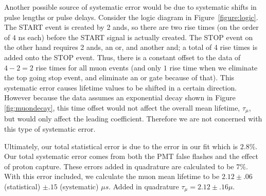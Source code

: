 Another possible source of systematic error would be due to systematic shifts in pulse lengths or pulse delays. Consider the logic diagram in Figure~\ref{figure:logic}. The START event is created by 2 ands, so there are two rise times (on the order of $4$ ns each) before the START signal is actually created. The STOP event on the other hand requires 2 ands, an or, and another and; a total of 4 rise times is added onto the STOP event. Thus, there is a constant offset to the data of $4-2=2$ rise times for all muon events (and only $1$ rise time when we eliminate the top going stop event, and eliminate an or gate because of that). This systematic error causes lifetime values to be shifted in a certain direction.  However because the data assumes an exponential decay shown in Figure \ref{fig:muondecay}, this time offset would not affect the overall mean lifetime, $\tau_{\mu}$, but would only affect the leading coefficient. Therefore we are not concerned with this type of systematic error.

Ultimately, our total statistical error is due to the error in our fit which is $2.8\%$.  Our total systematic error comes from both the PMT false flashes and the effect of proton capture.  These errors added in quadrature are calculated to be $7\%$.  With this error included, we calculate the muon mean lifetime to be $2.12\pm.06$ (statistical) $\pm.15$ (systematic) $\mu s$.  Added in quadrature $\tau_{\mu}=2.12\pm.16\mu$.
